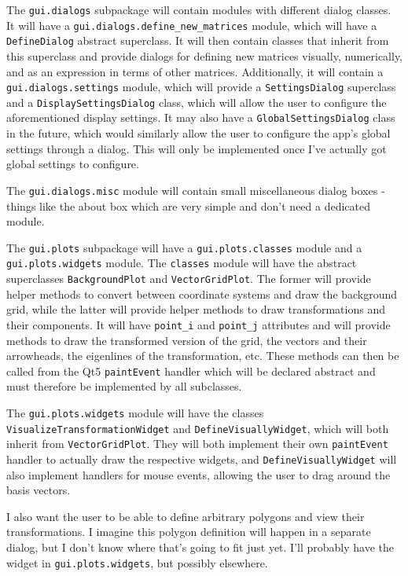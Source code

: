\documentclass[../main.tex]{subfiles}
\begin{document}
The \texttt{gui.dialogs} subpackage will contain modules with different dialog classes. It will have a \texttt{gui.dialogs.define_new_matrices} module, which will have a \texttt{DefineDialog} abstract superclass. It will then contain classes that inherit from this superclass and provide dialogs for defining new matrices visually, numerically, and as an expression in terms of other matrices. Additionally, it will contain a \texttt{gui.dialogs.settings} module, which will provide a \texttt{SettingsDialog} superclass and a \texttt{DisplaySettingsDialog} class, which will allow the user to configure the aforementioned display settings. It may also have a \texttt{GlobalSettingsDialog} class in the future, which would similarly allow the user to configure the app's global settings through a dialog. This will only be implemented once I've actually got global settings to configure.

The \texttt{gui.dialogs.misc} module will contain small miscellaneous dialog boxes - things like the about box which are very simple and don't need a dedicated module.

The \texttt{gui.plots} subpackage will have a \texttt{gui.plots.classes} module and a \texttt{gui.plots.widgets} module. The \texttt{classes} module will have the abstract superclasses \texttt{BackgroundPlot} and \texttt{VectorGridPlot}. The former will provide helper methods to convert between coordinate systems and draw the background grid, while the latter will provide helper methods to draw transformations and their components. It will have \texttt{point_i} and \texttt{point_j} attributes and will provide methods to draw the transformed version of the grid, the vectors and their arrowheads, the eigenlines of the transformation, etc. These methods can then be called from the Qt5 \texttt{paintEvent} handler which will be declared abstract and must therefore be implemented by all subclasses.

The \texttt{gui.plots.widgets} module will have the classes \texttt{VisualizeTransformationWidget} and \texttt{DefineVisuallyWidget}, which will both inherit from \texttt{VectorGridPlot}. They will both implement their own \texttt{paintEvent} handler to actually draw the respective widgets, and \texttt{DefineVisuallyWidget} will also implement handlers for mouse events, allowing the user to drag around the basis vectors.

I also want the user to be able to define arbitrary polygons and view their transformations. I imagine this polygon definition will happen in a separate dialog, but I don't know where that's going to fit just yet. I'll probably have the widget in \texttt{gui.plots.widgets}, but possibly elsewhere.
\end{document}
